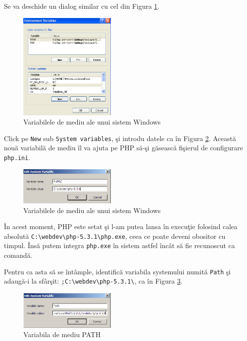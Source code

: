 Se va deschide un dialog similar cu cel din Figura \ref{img:win env vars}.
\begin{figure}[ht!]
  \centering
    \includegraphics[width=180px]{cap01/Screenshot-13.png}
  \caption{Variabilele de mediu ale unui sistem Windows}
  \label{img:win env vars}
\end{figure}

Click pe \texttt{New} sub \texttt{System variables}, şi introdu datele ca în
Figura \ref{img:win new env var}. Această nouă variabilă de mediu
îl va ajuta pe PHP să-şi găsească fişierul de configurare \texttt{php.ini}.
\begin{figure}[ht!]
  \centering
    \includegraphics[width=180px]{cap01/Screenshot-14.png}
  \caption{Variabilele de mediu ale unui sistem Windows}
  \label{img:win new env var}
\end{figure}

În acest moment, PHP este setat şi l-am putea lansa în execuţie folosind
calea absolută
\texttt{C:{\textbackslash}webdev{\textbackslash}php-5.3.1{\textbackslash}php.exe}, ceea ce
poate deveni obositor cu timpul. Însă putem integra \texttt{php.exe}
în sistem astfel încât să fie recunoscut ca comandă.

Pentru ca asta să
se întâmple, identifică
variabila systemului numită \texttt{Path}
şi adaugă-i la sfârşit:
\texttt{;C:{\textbackslash}webdev{\textbackslash}php-5.3.1{\textbackslash}}, ca în
Figura \ref{img:win env path}.
\begin{figure}[ht!]
  \centering
    \includegraphics[width=180px]{cap01/Screenshot-21.png}
  \caption{Variabila de mediu PATH}
  \label{img:win env path}
\end{figure}

